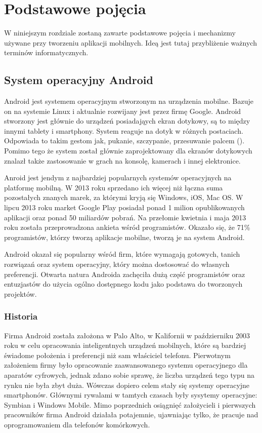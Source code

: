 \chapter{Podstawowe pojęcia}
\label{c2}

W niniejszym rozdziale zostaną zawarte podstawowe pojęcia i mechanizmy używane przy tworzeniu aplikacji mobilnych. Ideą jest tutaj przybliżenie ważnych terminów informatycznych.

\section{System operacyjny Android}

Android jest systemem operacyjnym stworzonym na urządzenia mobilne. Bazuje on na systemie Linux i aktualnie rozwijany jest przez firmę Google. Android stworzony jest głównie do urządzeń posiadająych ekran dotykowy, są to między innymi tablety i smartphony. System reaguje na dotyk w różnych postaciach. Odpowiada to takim gestom jak, pukanie, szczypanie, przesuwanie palcem (). Pomimo tego że system został głównie zaprojektowany dla ekranów dotykowych znalazł także zastosowanie w grach na konsolę, kamerach i innej elektronice.

Anroid jest jendym z najbardziej popularnych systemów operacyjnych na platformę mobilną. W 2013 roku sprzedano ich więcej niż łączna suma pozostałych znanych marek, za którymi kryją się Windows, iOS, Mac OS.\cite{android:1}\cite{android:3}\cite{android:3}\cite{android:4} W lipcu 2013 roku market Google Play posiadał ponad 1 milion opublikowanych aplikacji oraz ponad 50 miliardów pobrań.\cite{android:5} Na przełomie kwietnia i maja 2013 roku została przeprowadzona ankieta wśród programistów. Okazało się, że 71\% programistów, którzy tworzą aplikacje mobilne, tworzą je na system Android.\cite{android:6}

Android okazał się popularny wśród firm, które wymagają gotowych, tanich rozwiązań oraz system operacyjny, który można dostosować do własnych preferencji.\cite{android:7} Otwarta natura Androida zachęciła dużą część programistów oraz entuzjastów do użycia ogólno dostępnego kodu jako podstawa do tworzonych projektów.\cite{android:8}

\subsection{Historia}

Firma Android została założona w Palo Alto, w Kalifornii w październiku 2003 roku w celu opracowania inteligentnych urządzeń mobilnych, które są bardziej świadome położenia i preferencji niż sam właściciel telefonu.\cite{android:9} Pierwotnym założeniem firmy było opracowanie zaawansowanego systemu operacyjnego dla aparatów cyfrowych, jednak zdano sobie sprawę, że liczba urządzeń tego typu na rynku nie była zbyt duża. Wówczas dopiero celem stały się systemy operacyjne smartphonów. Głównymi rywalami w tamtych czasach były sysytemy operacyjne: Symbian i Windows Mobile.\cite{android:10} Mimo poprzednich osiągnięć założycieli i pierwszych pracowników firma Android działała potajemnie, ujawniając tylko, że pracuje nad oprogramowaniem dla telefonów komórkowych.\cite{android:9}

